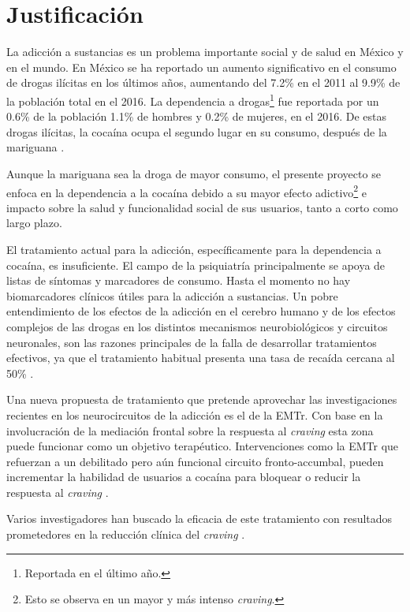 \section{Justificación}
La adicción a sustancias es un problema importante social y de salud en México y en el mundo.
En México se ha reportado un aumento significativo en el consumo de drogas ilícitas en los últimos años, aumentando del 7.2\% en el 2011 al 9.9\% de la población total en el 2016.
La dependencia a drogas\footnote{Reportada en el último año.} fue reportada por un 0.6\% de la población \textemdash{}1.1\% de hombres y 0.2\% de mujeres, en el 2016.
De estas drogas ilícitas, la cocaína ocupa el segundo lugar en su consumo, después de la mariguana \parencite{Villatoro-Velazques2017}.\par
Aunque la mariguana sea la droga de mayor consumo, el presente proyecto se enfoca en la dependencia a la cocaína debido a su mayor efecto adictivo\footnote{Esto se observa en un mayor y más intenso \textit{craving}.} e impacto sobre la salud y funcionalidad social de sus usuarios, tanto a corto como largo plazo. \par
El tratamiento actual para la adicción, específicamente para la dependencia a cocaína, es insuficiente.
El campo de la psiquiatría principalmente se apoya de listas de síntomas y marcadores de consumo.
Hasta el momento no hay biomarcadores clínicos útiles para la adicción a sustancias.
Un pobre entendimiento de los efectos de la adicción en el cerebro humano y de los efectos complejos de las drogas en los distintos mecanismos neurobiológicos y circuitos neuronales, son las razones principales de la falla de desarrollar tratamientos efectivos, ya que el tratamiento habitual presenta una tasa de recaída cercana al 50\% \parencite{McLellan2000a}. \par
Una nueva propuesta de tratamiento que pretende aprovechar las investigaciones recientes en los neurocircuitos de la adicción es el de la EMTr.
Con base en la involucración de la mediación frontal sobre la respuesta al \textit{craving} esta zona puede funcionar como un objetivo terapéutico. Intervenciones como la EMTr que refuerzan a un debilitado pero aún funcional circuito fronto-accumbal, pueden incrementar la habilidad de usuarios a cocaína para bloquear o reducir la respuesta al \textit{craving} \parencite{Volkow2010a}. \par
Varios investigadores han buscado la eficacia de este tratamiento con resultados prometedores en la reducción clínica del \textit{craving} \parencite{Rachid2018}.
